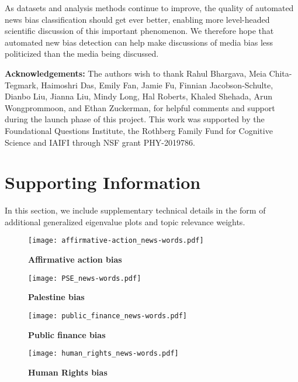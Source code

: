 \documentclass[10pt,letterpaper]{article}
\begin{document}
As datasets and analysis methods continue to improve, the quality of automated news bias classification should get ever better, enabling more level-headed scientific discussion of this important phenomenon.
We therefore hope that automated new bias detection can help make discussions of media bias less politicized than the media being discussed.


\bigskip
{\bf  Acknowledgements:}
The authors wish to thank 
Rahul Bhargava,
Meia Chita-Tegmark,
Haimoshri Das,
Emily Fan,
Jamie Fu,
Finnian Jacobson-Schulte,
Dianbo Liu,
Jianna Liu, %
Mindy Long,
Hal Roberts,
Khaled Shehada,
Arun Wongprommoon, %
and
Ethan Zuckerman,
for helpful comments and support during the launch phase of this project.
This work was supported by the Foundational Questions Institute, 
the Rothberg Family Fund for Cognitive Science and IAIFI through NSF grant PHY-2019786.

	



\clearpage
\section*{Supporting Information}\label{S1-Appendix}

In this section, we include supplementary technical details in the form of additional generalized eigenvalue plots and topic relevance weights.

\begin{figure}[h] \hglue-4cm \caption{\bf{Affirmative
 action bias}}\texttt{[image: affirmative-action\_news-words.pdf]}\label{affirmative_action}
\end{figure}

\begin{figure}[h] \hglue-4cm \caption{\bf Palestine bias}\texttt{[image: PSE\_news-words.pdf]}\label{PSE}
\end{figure}

\begin{figure}[h] \hglue-4cm \caption{\bf Public finance bias}\texttt{[image: public\_finance\_news-words.pdf]}\label{publicfinance}
\end{figure}

\begin{figure}[h] \hglue-4cm \caption{\bf Human Rights bias}\texttt{[image: human\_rights\_news-words.pdf]}\label{humanrights}
\end{figure}
\end{document}
